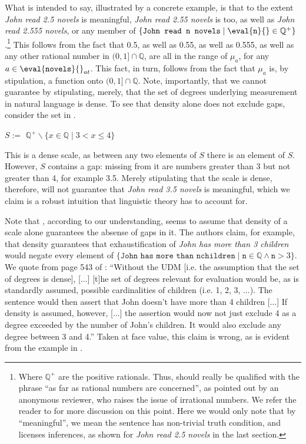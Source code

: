 \documentclass[output=paper]{langscibook}
\begin{document}
\noindent What  is intended to say, illustrated by a concrete example, is that to the extent \textit{John read 2.5 novels} is meaningful, \textit{John read 2.55 novels} is too, as well as \textit{John read 2.555 novels}, or any member of $\{\texttt{John read n novels} \mid \eval{\texttt{n}}{} \in \mathbb{Q}^+\}$.\footnote{Where $\mathbb{Q}^+$ are the positive rationals. Thus,  should really be qualified with the phrase ``as far as rational numbers are concerned'', as pointed out by an anonymous reviewer, who raises the issue of irrational numbers. We refer the reader to  for more discussion on this point. Here we would only note that by ``meaningful'', we mean the sentence has non-trivial truth condition, and licenses inferences, as shown for \textit{John read 2.5 novels} in the last section.} This follows from the fact that 0.5, as well as 0.55, as well as 0.555, as well as any other rational number in $(0,1]\cap\mathbb{Q}$, are all in the range of $\mu_a$, for any $a \in \eval{\texttt{novels}}{}_{at}$. This fact, in turn, follows from the fact that $\mu_a$ is, by stipulation, a function onto $(0,1]\cap\mathbb{Q}$. Note, importantly, that we cannot guarantee  by stipulating, merely, that the set of degrees underlying measurement in natural language is dense. To see that density alone does not exclude gaps, consider the set in .

\ea  
$S :=$ $\mathbb{Q}^+ \backslash \{x \in \mathbb{Q} \mid 3 < x \leq 4\}$
\label{hai-tri:dense+gap}
\z

\noindent This is a dense scale, as between any two elements of $S$ there is an element of $S$. However, $S$ contains a gap: missing from it are numbers greater than 3 but not greater than 4, for example 3.5. Merely stipulating that the scale is dense, therefore, will not guarantee that \textit{John read 3.5 novels} is meaningful, which we claim is a robust intuition that linguistic theory has to account for.

Note that \citet{foxhackl2006universal}, according to our understanding, seems to assume that density of a scale alone guarantees the absense of gaps in it. The authors claim, for example, that density guarantees that exhaustification of \textit{John has more than 3 children} would negate every element of $\{\texttt{John has more than n}\allowbreak \texttt{children} \mid \texttt{n} \in \mathbb{Q} \wedge \texttt{n} > 3\}$. We quote from page 543 of \citet{foxhackl2006universal}: ``Without the UDM [i.e. the assumption that the set of degrees is dense], [...] [t]he set of degrees relevant for evaluation would be, as is standardly assumed, possible cardinalities of children (i.e. 1, 2, 3, ...). The sentence would then assert that John doesn't have more than 4 children [...] If density is assumed, however, [...] the assertion would now not just exclude 4 as a degree exceeded by the number of John’s children. It would also exclude any degree between 3 and 4.'' Taken at face value, this claim is wrong, as is evident from the example in . 
\end{document}
